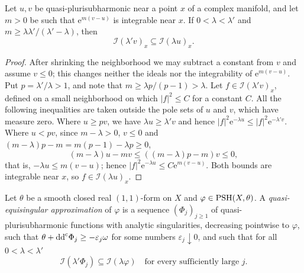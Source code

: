 \begin{lemma}\label{lem:integrable-gap-ideal-transfer}
Let $u,v$ be quasi-plurisubharmonic near a point $x$ of a complex manifold, and let $m>0$ be such that $\mathrm e^{m(v-u)}$ is integrable near $x$. If $0<\lambda<\lambda'$ and $m\geq\lambda\lambda'/(\lambda'-\lambda)$, then
\[
 \mathcal I(\lambda'v)_x\subseteq\mathcal I(\lambda u)_x.
\]
\end{lemma}
\begin{proof}
After shrinking the neighborhood we may subtract a constant from $v$ and assume $v\leq0$; this changes neither the ideals nor the integrability of $\mathrm e^{m(v-u)}$. Put $p=\lambda'/\lambda>1$, and note that $m\geq\lambda p/(p-1)>\lambda$. Let $f\in\mathcal I(\lambda'v)_x$, defined on a small neighborhood on which $|f|^2\leq C$ for a constant $C$. All the following inequalities are taken outside the pole sets of $u$ and $v$, which have measure zero. Where $u\geq pv$, we have $\lambda u\geq\lambda'v$ and hence $|f|^2\mathrm e^{-\lambda u}\leq|f|^2\mathrm e^{-\lambda'v}$. Where $u<pv$, since $m-\lambda>0$, $v\leq0$ and $(m-\lambda)p-m=m(p-1)-\lambda p\geq0$,
\[
 (m-\lambda)u-mv\leq((m-\lambda)p-m)v\leq0,
\]
that is, $-\lambda u\leq m(v-u)$; hence $|f|^2\mathrm e^{-\lambda u}\leq C\mathrm e^{m(v-u)}$. Both bounds are integrable near $x$, so $f\in\mathcal I(\lambda u)_x$.
\end{proof}

\begin{definition}\label{def:quasi-equisingular-approximation}
Let $\theta$ be a smooth closed real $(1,1)$-form on $X$ and $\varphi\in\mathrm{PSH}(X,\theta)$. A \emph{quasi-equisingular approximation} of $\varphi$ is a sequence $(\Phi_j)_{j\geq1}$ of quasi-plurisubharmonic functions with analytic singularities, decreasing pointwise to $\varphi$, such that $\theta+\mathrm{dd}^{\mathrm{c}}\Phi_j\geq-\varepsilon_j\omega$ for some numbers $\varepsilon_j\downarrow0$, and such that for all $0<\lambda<\lambda'$
\[
 \mathcal I(\lambda'\Phi_j)\subseteq\mathcal I(\lambda\varphi)
 \quad\text{for every sufficiently large }j.
\]
\end{definition}

